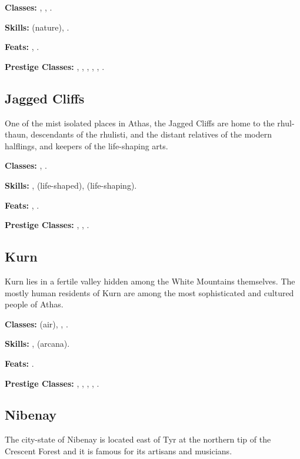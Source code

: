 \textbf{Classes:} , , .

\textbf{Skills:}  (nature), .

\textbf{Feats:} , .

\textbf{Prestige Classes:} , , , , , .


\subsection{Jagged Cliffs}
One of the mist isolated places in Athas, the Jagged Cliffs are home to the rhul-thaun, descendants of the rhulisti, and the distant relatives of the modern halflings, and keepers of the life-shaping arts.

\textbf{Classes:} , .

\textbf{Skills:} ,  (life-shaped),  (life-shaping).

\textbf{Feats:} , .

\textbf{Prestige Classes:} , , .


\subsection{Kurn}
Kurn lies in a fertile valley hidden among the White Mountains themselves. The mostly human residents of Kurn are among the most sophisticated and cultured people of Athas.

\textbf{Classes:}  (air), , .

\textbf{Skills:} ,  (arcana).

\textbf{Feats:} .

\textbf{Prestige Classes:} , , , , .

\subsection{Nibenay}
The city-state of Nibenay is located east of Tyr at the northern tip of the Crescent Forest and it is famous for its artisans and musicians.

